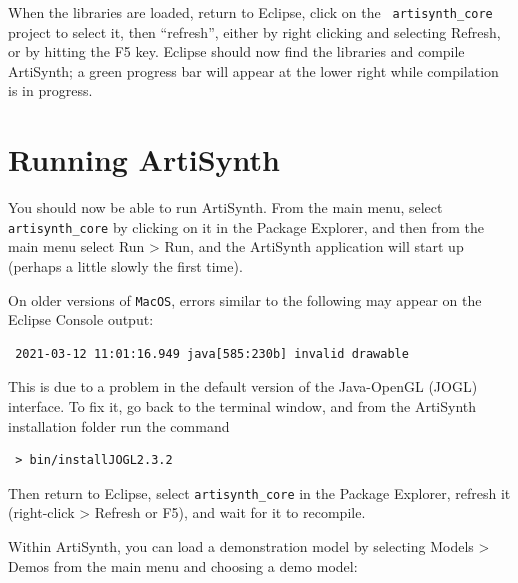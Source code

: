When the libraries are loaded, return to Eclipse, click on the {\tt
artisynth\_core} project to select it, then ``refresh'', either by
right clicking and selecting {\sf Refresh}, or by hitting the {\sf F5}
key. Eclipse should now find the libraries and compile ArtiSynth; a
green progress bar will appear at the lower right while compilation is
in progress.

\section{Running ArtiSynth}

You should now be able to run ArtiSynth. From the main menu, select
{\tt artisynth\_core} by clicking on it in the Package Explorer, and
then from the main menu select {\sf Run > Run}, and the ArtiSynth
application will start up (perhaps a little slowly the first time).
\ifMacOS

\begin{sideblock}
On older versions of {\tt MacOS}, errors similar to the following
may appear on the Eclipse Console output:
\begin{verbatim}
 2021-03-12 11:01:16.949 java[585:230b] invalid drawable 
\end{verbatim}
This is due to a problem in the default version of the Java-OpenGL
(JOGL) interface. To fix it, go back to the terminal window, and
from the ArtiSynth installation folder run the command
\begin{verbatim}
 > bin/installJOGL2.3.2
\end{verbatim}
Then return to Eclipse, select {\tt artisynth\_core} in the Package
Explorer, refresh it (right-click > {\sf Refresh} or {\sf F5}), and
wait for it to recompile.
\end{sideblock}

\fi
Within ArtiSynth, you can load a demonstration model by selecting
{\sf Models > Demos} from the main menu and choosing a demo model:

